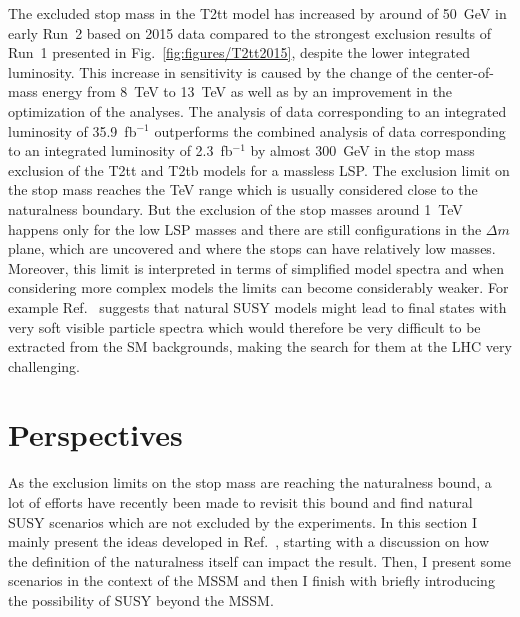 The excluded stop mass in the T2tt model has increased by around of 50~GeV in early Run~2 based on 2015 data compared to the strongest exclusion results of Run~1 presented in Fig.~\ref{fig:figures/T2tt2015}, despite the lower integrated luminosity. This increase in sensitivity is caused by the change of the center-of-mass energy from 8~TeV to 13~TeV as well as by an improvement in the optimization of the analyses. The analysis of data corresponding to an integrated luminosity of 35.9~fb$^{-1}$ outperforms the combined analysis of data corresponding to an integrated luminosity of 2.3~fb$^{-1}$ by almost 300~GeV in the stop mass exclusion of the T2tt and T2tb models for a massless LSP. The exclusion limit on the stop mass reaches the TeV range which is usually considered close to the naturalness boundary. But the exclusion of the stop masses around 1~TeV happens only for the low LSP masses and there are still configurations in the $\Delta m$ plane, which are uncovered and where the stops can have relatively low masses. Moreover, this limit is interpreted in terms of simplified model spectra and when considering more complex models the limits can become considerably weaker. For example Ref.~\cite{Baer:2012uy} suggests that natural SUSY models might lead to final states with very soft visible particle spectra which would therefore be very difficult to be extracted from the SM backgrounds, making the search for them at the LHC very challenging.%


\newpage

\section{Perspectives}

As the exclusion limits on the stop mass are reaching the naturalness bound, a lot of efforts have  recently been made to revisit this bound and find natural SUSY scenarios which are not excluded by the experiments. In this section I mainly present the ideas developed in Ref.~\cite{Baer:2016bwh}, starting with a discussion on how the definition of the naturalness itself can impact the result. Then, I present some scenarios in the context of the MSSM and then I finish with briefly introducing the possibility of SUSY beyond the MSSM.


